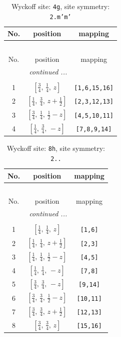 \documentclass[fleqn,8pt]{jsarticle}
\begin{document}
\renewcommand{\arraystretch}{1.2}
\begin{longtable}{ccc}
\caption{Wyckoff site: {\tt 4g}, site symmetry: {\tt 2.m'm'}}
 \\
 \hline \hline
No. & position & mapping \\ \hline \endfirsthead

\multicolumn{2}{l}{\tablename\ \thetable{}} \\
 \hline \hline
No. & position & mapping \\ \hline \endhead

 \hline \hline
\multicolumn{2}{r}{\footnotesize\it continued ...} \\ \endfoot

 \hline \hline
\multicolumn{2}{r}{} \\ \endlastfoot

1 & $\left[ \frac{3}{4},\, \frac{1}{4},\, z \right]$ & {\tt [1,6,15,16]} \\ \hline
2 & $\left[ \frac{1}{4},\, \frac{3}{4},\, z + \frac{1}{2} \right]$ & {\tt [2,3,12,13]} \\ \hline
3 & $\left[ \frac{3}{4},\, \frac{1}{4},\, \frac{1}{2} - z \right]$ & {\tt [4,5,10,11]} \\ \hline
4 & $\left[ \frac{1}{4},\, \frac{3}{4},\, - z \right]$ & {\tt [7,8,9,14]} \\
\end{longtable}
\renewcommand{\arraystretch}{1.2}
\begin{longtable}{ccc}
\caption{Wyckoff site: {\tt 8h}, site symmetry: {\tt 2..}}
 \\
 \hline \hline
No. & position & mapping \\ \hline \endfirsthead

\multicolumn{2}{l}{\tablename\ \thetable{}} \\
 \hline \hline
No. & position & mapping \\ \hline \endhead

 \hline \hline
\multicolumn{2}{r}{\footnotesize\it continued ...} \\ \endfoot

 \hline \hline
\multicolumn{2}{r}{} \\ \endlastfoot

1 & $\left[ \frac{1}{4},\, \frac{1}{4},\, z \right]$ & {\tt [1,6]} \\ \hline
2 & $\left[ \frac{1}{4},\, \frac{1}{4},\, z + \frac{1}{2} \right]$ & {\tt [2,3]} \\ \hline
3 & $\left[ \frac{1}{4},\, \frac{1}{4},\, \frac{1}{2} - z \right]$ & {\tt [4,5]} \\ \hline
4 & $\left[ \frac{1}{4},\, \frac{1}{4},\, - z \right]$ & {\tt [7,8]} \\ \hline
5 & $\left[ \frac{3}{4},\, \frac{3}{4},\, - z \right]$ & {\tt [9,14]} \\ \hline
6 & $\left[ \frac{3}{4},\, \frac{3}{4},\, \frac{1}{2} - z \right]$ & {\tt [10,11]} \\ \hline
7 & $\left[ \frac{3}{4},\, \frac{3}{4},\, z + \frac{1}{2} \right]$ & {\tt [12,13]} \\ \hline
8 & $\left[ \frac{3}{4},\, \frac{3}{4},\, z \right]$ & {\tt [15,16]} \\
\end{longtable}
\end{document}
